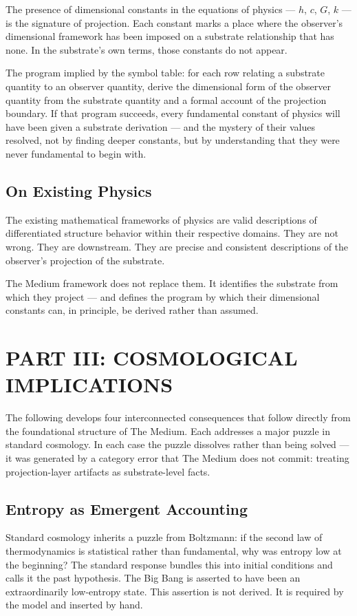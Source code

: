 \documentclass[11pt,letterpaper]{article}
\begin{document}
The presence of dimensional constants in the equations of physics --- \(h\), \(c\), \(G\), \(k\) --- is the signature of projection. Each constant marks a place where the observer's dimensional framework has been imposed on a substrate relationship that has none. In the substrate's own terms, those constants do not appear.

The program implied by the symbol table: for each row relating a substrate quantity to an observer quantity, derive the dimensional form of the observer quantity from the substrate quantity and a formal account of the projection boundary. If that program succeeds, every fundamental constant of physics will have been given a substrate derivation --- and the mystery of their values resolved, not by finding deeper constants, but by understanding that they were never fundamental to begin with.
\subsection{On Existing Physics}
\label{sec:org4bd7fff}

The existing mathematical frameworks of physics are valid descriptions of differentiated structure behavior within their respective domains. They are not wrong. They are downstream. They are precise and consistent descriptions of the observer's projection of the substrate.

The Medium framework does not replace them. It identifies the substrate from which they project --- and defines the program by which their dimensional constants can, in principle, be derived rather than assumed.
\section{PART III: COSMOLOGICAL IMPLICATIONS}
\label{sec:orgecce33e}

The following develops four interconnected consequences that follow directly from the foundational structure of The Medium. Each addresses a major puzzle in standard cosmology. In each case the puzzle dissolves rather than being solved --- it was generated by a category error that The Medium does not commit: treating projection-layer artifacts as substrate-level facts.
\subsection{Entropy as Emergent Accounting}
\label{sec:orgaf8b6f2}

Standard cosmology inherits a puzzle from Boltzmann: if the second law of thermodynamics is statistical rather than fundamental, why was entropy low at the beginning? The standard response bundles this into initial conditions and calls it the past hypothesis. The Big Bang is asserted to have been an extraordinarily low-entropy state. This assertion is not derived. It is required by the model and inserted by hand.
\end{document}
